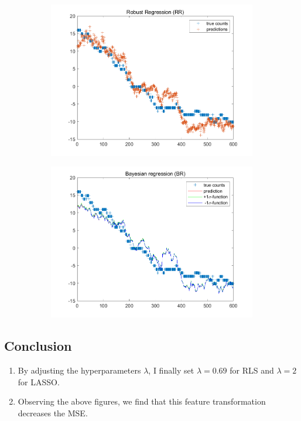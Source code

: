 \documentclass{article}
\begin{document}
\begin{figure}[H]
\begin{subfigure}[b]{0.475\textwidth}
        \includegraphics[width=\textwidth]{fig/2c-rr.png} 
    \end{subfigure}
    \quad
    \begin{subfigure}[b]{0.475\textwidth}   
        \centering 
        \includegraphics[width=\textwidth]{fig/2c-br.png} 
    \end{subfigure}
\end{figure}

\subsection*{Conclusion}
\begin{enumerate}[label=(\roman*)]
    \item By adjusting the hyperparameters $\lambda$, I finally set $\lambda = 0.69$ for RLS and $\lambda = 2$ for LASSO.
    \item Observing the above figures, we find that this feature transformation decreases the MSE. 
\end{enumerate}
\end{document}
